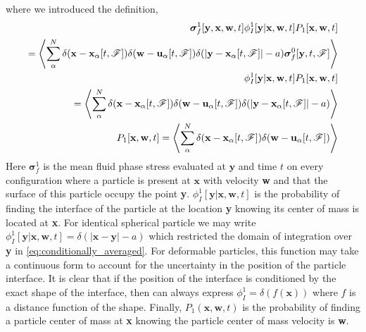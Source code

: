 where we introduced the definition, 
\begin{align}
    \bm\sigma^1_f[\textbf{y},\textbf{x},\textbf{w},t]
    \phi_I^1[\textbf{y}|\textbf{x},\textbf{w},t] 
    P_1[\textbf{x},\textbf{w},t]\nonumber\\
    = 
    \left<
    \sum_\alpha^N 
    \delta(\textbf{x} - \textbf{x}_\alpha[t,\mathscr{F}])
    \delta(\textbf{w} - \textbf{u}_\alpha[t,\mathscr{F}])
    \delta(|\textbf{y} - \textbf{x}_{\alpha}[t,\mathscr{F}]|-a)
    \bm\sigma_f^0[\textbf{y},t,\mathscr{F}]
    \right>
    \label{eq:sigma_f_1}
    \\
    \phi_I^1[\textbf{y}|\textbf{x},\textbf{w},t] 
    P_1[\textbf{x},\textbf{w},t]\nonumber\\
    = 
    \left<
    \sum_\alpha^N 
    \delta(\textbf{x} - \textbf{x}_\alpha[t,\mathscr{F}])
    \delta(\textbf{w} - \textbf{u}_\alpha[t,\mathscr{F}])
    \delta(|\textbf{y} - \textbf{x}_{\alpha}[t,\mathscr{F}]|-a)
    \right>\\
    P_1[\textbf{x},\textbf{w},t]
    = 
    \left<
    \sum_\alpha^N 
    \delta(\textbf{x} - \textbf{x}_\alpha[t,\mathscr{F}])
    \delta(\textbf{w} - \textbf{u}_\alpha[t,\mathscr{F}])
    \right>
\end{align}
Here $\bm\sigma^1_f$ is the mean fluid phase stress evaluated at $\textbf{y}$ and time $t$ on every configuration where a particle is present at $\textbf{x}$ with velocity \textbf{w} and that the surface of this particle occupy the point \textbf{y}.
$\phi_I^1[\textbf{y}|\textbf{x},\textbf{w},t] $ is the probability of finding the interface of the particle at the location \textbf{y} knowing its center of mass is located at \textbf{x}. 
For identical spherical particle we may write $\phi_I^1[\textbf{y}|\textbf{x},\textbf{w},t] = \delta(|\textbf{x} - \textbf{y}| -a)$ which restricted the domain of integration over \textbf{y} in \ref{eq:conditionally_averaged}. 
For deformable particles, this function may take a continuous form to account for the uncertainty in the position of the particle interface. 
It is clear that if the position of the interface is conditioned by the exact shape of the interface, then can always express $\phi_I^1 = \delta(f(\textbf{x}))$ where $f$ is a distance function of the shape. 
Finally, $P_1(\textbf{x},\textbf{w},t)$ is the probability of finding a particle center of mass at \textbf{x} knowing the particle center of mass velocity is  \textbf{w}.
